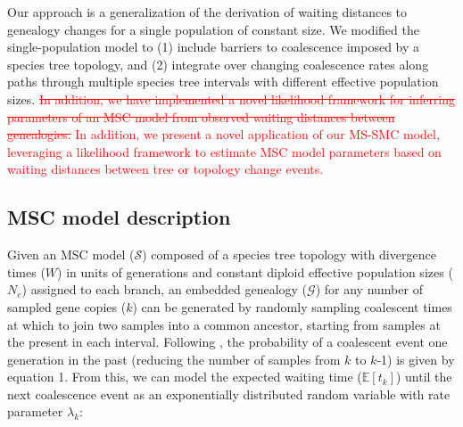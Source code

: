 \documentclass[11pt]{article}
\begin{document}
Our approach is a generalization of the \citet{deng_distribution_2021} derivation 
of waiting distances to genealogy changes for a single population of constant size. 
We modified the single-population model to (1) include barriers to coalescence imposed
by a species tree topology, and (2) integrate over changing coalescence rates along
paths through multiple species tree intervals with different effective population 
sizes. 
\textcolor{red}{
\sout{
In addition, we have implemented a novel likelihood framework for inferring 
parameters of an MSC model from observed waiting distances between genealogies.
}
In addition, we present a novel application of our MS-SMC model, leveraging
a likelihood framework to estimate MSC model parameters based on waiting
distances between tree or topology change events.
}



\subsection{MSC model description}
Given an MSC model ($\mathcal{S}$) composed of a species tree topology with divergence
times ($W$) in units of generations and constant diploid effective population 
sizes ($N_e$) assigned to each branch, an embedded genealogy ($\mathcal{G}$) for 
any number of sampled gene copies ($k$) can be generated
by randomly sampling coalescent times at which to join two samples into a 
common ancestor, starting from samples at the present in each interval.
% 
% 
% 
Following \citet{kingman1982coalescent}, the probability of a 
coalescent event one generation in the past (reducing the 
number of samples from $k$ to $k$-1) %
is given by equation 1. From this, we can model the expected 
waiting time ($\mathbb{E}[t_k]$) until the next coalescence event as an 
exponentially distributed random variable with rate parameter $\lambda_k$:
\end{document}
